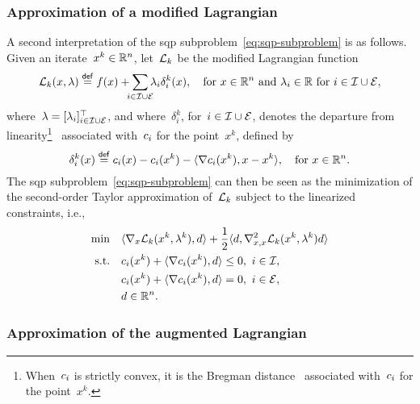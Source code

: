 \subsubsection{Approximation of a modified Lagrangian}

A second interpretation of the \gls{sqp} subproblem~\cref{eq:sqp-subproblem} is as follows.
Given an iterate~$x^k \in \mathbb{R}^n$, let~$\lag[k]$ be the modified Lagrangian function
\begin{equation*}
    \lag[k](x, \lambda) \eqdef \obj(x) + \sum_{\mathclap{i \in \iub \cup \ieq}} \lambda_i \delta_i^k(x), \quad \text{for~$x \in \R^n$ and~$\lambda_i \in \R$ for~$i \in \iub \cup \ieq$},
\end{equation*}
where~$\lambda = [\lambda_i]_{i \in \mathcal{I} \cup \mathcal{E}}^{\top}$, and where~$\delta_i^k$, for~$i \in \mathcal{I} \cup \mathcal{E}$, denotes the departure from linearity\footnote{When~$c_{i}$ is strictly convex, it is the Bregman distance~\cite{Bregman_1967} associated with~$c_{i}$ for the point~$x^k$.}~\cite{Robinson_1972,Hoek_1982} associated with~$c_{i}$ for the point~$x^k$, defined by
\begin{equation*}
    \delta_i^k(x) \mathrel{\stackrel{\mathsf{def}}{=}} c_{i}(x) - c_{i}(x^k) - \langle\nabla c_{i}(x^k), x - x^k\rangle, \quad \text{for~$x \in \mathbb{R}^n$.}
\end{equation*}
The \gls{sqp} subproblem~\cref{eq:sqp-subproblem} can then be seen as the minimization of the second-order Taylor approximation of~$\lag[k]$ subject to the linearized constraints, i.e.,
\begin{align}
    \min        & \quad \inner{\nabla_x \lag[k](x^k, \lambda^k), d} + \frac{1}{2} \inner{d, \nabla_{x, x}^2 \lag[k](x^k, \lambda^k) d}\\
    \text{s.t.} & \quad \con{i}(x^k) + \inner{\nabla \con{i}(x^k), d} \le 0, ~ i \in \iub,\\
                & \quad \con{i}(x^k) + \inner{\nabla \con{i}(x^k), d} = 0, ~ i \in \ieq,\\
                & \quad d \in \R^n.
\end{align}

\subsubsection{Approximation of the augmented Lagrangian}

